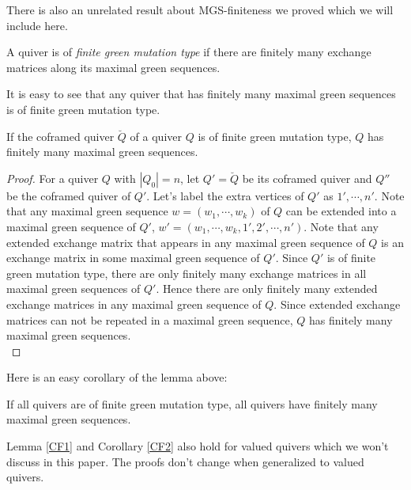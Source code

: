 \indent There is also an unrelated result about MGS-finiteness we proved which we will include here.
\begin{definition}
A quiver is of \textit{finite green mutation type} if there are finitely many exchange matrices along its maximal green sequences.
\end{definition}
It is easy to see that any quiver that has finitely many maximal green sequences is of finite green mutation type.\\
\begin{lemma}\label{CF1}
If the coframed quiver $\breve{Q}$ of a quiver $Q$ is of finite green mutation type, $Q$ has finitely many maximal green sequences.\\
\end{lemma}
\begin{proof}
For a quiver $Q$ with $|Q_0|=n$, let $Q'=\breve{Q}$ be its coframed quiver and $Q''$ be the coframed quiver of $Q'$. Let's label the extra vertices of $Q'$ as $1',\cdots, n'$. Note that any maximal green sequence $w=(w_1,\cdots, w_k)$ of $Q$ can be extended into a maximal green sequence of $Q'$, $w'=(w_1,\cdots, w_k, 1', 2',\cdots, n')$. Note that any extended exchange matrix that appears in any maximal green sequence of $Q$ is an exchange matrix in some maximal green sequence of $Q'$. Since $Q'$ is of finite green mutation type, there are only finitely many exchange matrices in all maximal green sequences of $Q'$. Hence there are only finitely many extended exchange matrices in any maximal green sequence of $Q$. Since extended exchange matrices can not be repeated in a maximal green sequence, $Q$ has finitely many maximal green sequences.\\ 
\end{proof}
\indent Here is an easy corollary of the lemma above:\\
\begin{corollary}\label{CF2}
If all quivers are of finite green mutation type, all quivers have finitely many maximal green sequences.\\
\end{corollary}
\indent Lemma \ref{CF1} and Corollary \ref{CF2} also hold for valued quivers which we won't discuss in this paper. The proofs don't change when generalized to valued quivers.\\ 

